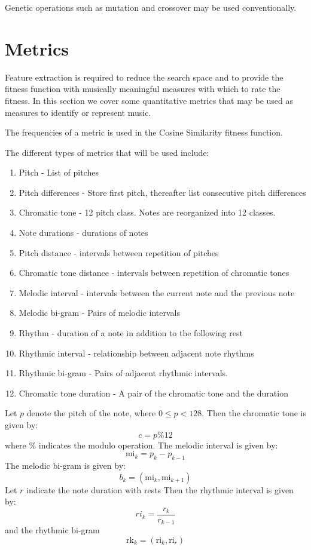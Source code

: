 Genetic operations such as mutation and crossover may be used conventionally.

\section{Metrics} \label{chap:metrics}
Feature extraction is required to reduce the search space and to provide the fitness function with musically meaningful measures with which to rate the fitness. In this section we cover some quantitative metrics that may be used as measures to identify or represent music.

The frequencies of a metric is used in the Cosine Similarity fitness function.

The different types of metrics that will be used include:
\begin{enumerate}
\item Pitch - List of pitches
\item Pitch differences - Store first pitch, thereafter list consecutive pitch differences
\item Chromatic tone - 12 pitch class. Notes are reorganized into 12 classes.
\item Note durations - durations of notes
\item Pitch distance - intervals between repetition of pitches
\item Chromatic tone distance - intervals between repetition of chromatic tones  
\item Melodic interval - intervals between the current note and the previous note
\item Melodic bi-gram - Pairs of melodic intervals
\item Rhythm - duration of a note in addition to the following rest
\item Rhythmic interval - relationship between adjacent note rhythms
\item Rhythmic bi-gram - Pairs of adjacent rhythmic intervals.
\item Chromatic tone duration - A pair of the chromatic tone and the duration
\end{enumerate}

Let $p$ denote the pitch of the note, where $0 \leq p < 128$.
Then the chromatic tone is given by:
\[c = p \% 12\]
where $\%$ indicates the modulo operation.
The melodic interval is given by:
\[\text{mi}_k = p_k - p_{k-1} \]
The melodic bi-gram is given by:
\[b_k = (\text{mi}_k, \text{mi}_{k+1}) \]
Let $r$ indicate the note duration with rests
Then the rhythmic interval is given by:
\[\text{}ri_k = \frac{r_k}{r_{k-1}} \]
and the rhythmic bi-gram
\[\text{rk}_k = (\text{ri}_k, \text{ri}_r) \]

